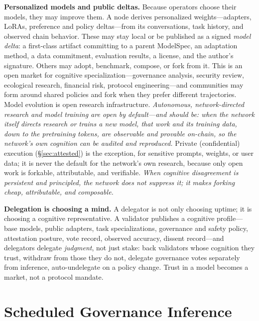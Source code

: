 \documentclass[11pt]{article}
\begin{document}
\noindent\textbf{Personalized models and public deltas.} Because operators choose their models, they may improve them. A node derives personalized weights---adapters, LoRAs, preference and policy deltas---from its conversations, task history, and observed chain behavior. These may stay local or be published as a signed \emph{model delta}: a first-class artifact committing to a parent ModelSpec, an adaptation method, a data commitment, evaluation results, a license, and the author's signature. Others may adopt, benchmark, compose, or fork from it. This is an open market for cognitive specialization---governance analysis, security review, ecological research, financial risk, protocol engineering---and communities may form around shared policies and fork when they prefer different trajectories. Model evolution is open research infrastructure. \emph{Autonomous, network-directed research and model training are open by default---and should be: when the network itself directs research or trains a new model, that work and its training data, down to the pretraining tokens, are observable and provable on-chain, so the network's own cognition can be audited and reproduced.} Private (confidential) execution (\S\ref{sec:attested}) is the exception, for sensitive prompts, weights, or user data; it is never the default for the network's own research, because only open work is forkable, attributable, and verifiable. \emph{When cognitive disagreement is persistent and principled, the network does not suppress it; it makes forking cheap, attributable, and composable.}

\medskip\noindent\textbf{Delegation is choosing a mind.} A delegator is not only choosing uptime; it is choosing a cognitive representative. A validator publishes a cognitive profile---base models, public adapters, task specializations, governance and safety policy, attestation posture, vote record, observed accuracy, dissent record---and delegators delegate \emph{judgment}, not just stake: back validators whose cognition they trust, withdraw from those they do not, delegate governance votes separately from inference, auto-undelegate on a policy change. Trust in a model becomes a market, not a protocol mandate.

\section{Scheduled Governance Inference}
\label{sec:gov}
\end{document}
